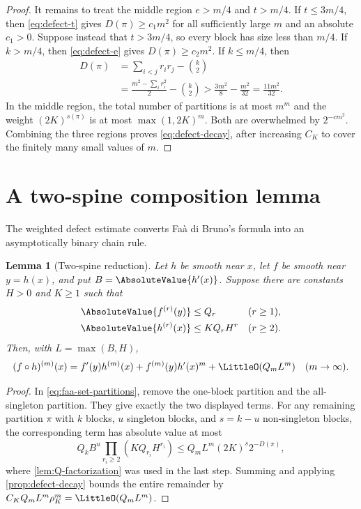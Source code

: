 \documentclass[11pt,oneside]{article}
\newtheorem{lemma}[theorem]{Lemma}
\theoremstyle{definition}
\theoremstyle{remark}
\newcommand{\comp}{\mathbin{\circ}}
\begin{document}
\begin{proof}
It remains to treat the middle region $e>m/4$ and $t>m/4$.  If $t\leq3m/4$, then
\eqref{eq:defect-t} gives $D(\pi)\geq c_1m^2$ for all sufficiently large $m$ and an
absolute $c_1>0$.  Suppose instead that $t>3m/4$, so every block has size less than
$m/4$.  If $k>m/4$, then \eqref{eq:defect-e} gives
$D(\pi)\geq c_2m^2$.  If $k\leq m/4$, then
\begin{align*}
 D(\pi)
 &=\sum_{i<j}r_ir_j-\binom k2\\
 &=\frac{m^2-\sum_i r_i^2}{2}-\binom k2
 >\frac{3m^2}{8}-\frac{m^2}{32}
 =\frac{11m^2}{32}.
\end{align*}
In the middle region, the total number of partitions is at most $m^m$ and the weight
$(2K)^{s(\pi)}$ is at most $\max(1,2K)^m$.  Both are overwhelmed by
$2^{-c m^2}$.  Combining the three regions proves \eqref{eq:defect-decay}, after
increasing $C_K$ to cover the finitely many small values of $m$.
\end{proof}

\section{A two-spine composition lemma}
\label{sec:two-spine}

The weighted defect estimate converts Fa\`a di Bruno's formula into an asymptotically
binary chain rule.

\begin{lemma}[Two-spine reduction]
\label{lem:two-spine}
Let $h$ be smooth near $x$, let $f$ be smooth near $y=h(x)$, and put
$B=\AbsoluteValue{h'(x)}$.  Suppose
there are constants $H>0$ and $K\geq1$ such that
\begin{align}
 \AbsoluteValue{f^{(r)}(y)}&\leq Q_r &&(r\geq1),
 \label{eq:f-envelope}\\
 \AbsoluteValue{h^{(r)}(x)}&\leq KQ_rH^r &&(r\geq2).
 \label{eq:h-envelope}
\end{align}
Then, with $L=\max(B,H)$,
\begin{equation}
 (f\comp h)^{(m)}(x)
 =f'(y)h^{(m)}(x)+f^{(m)}(y)h'(x)^m
  +\LittleO(Q_mL^m)
 \quad(m\to\infty).
 \label{eq:two-spine}
\end{equation}
\end{lemma}

\begin{proof}
In \eqref{eq:faa-set-partitions}, remove the one-block partition and the all-singleton
partition.  They give exactly the two displayed terms.  For any remaining partition
$\pi$ with $k$ blocks, $u$ singleton blocks, and $s=k-u$ non-singleton blocks, the
corresponding term has absolute value at most
\[
 Q_k B^u\prod_{r_i\ge2}(KQ_{r_i}H^{r_i})
 \leq Q_mL^m(2K)^s2^{-D(\pi)},
\]
where \cref{lem:Q-factorization} was used in the last step.  Summing and applying
\cref{prop:defect-decay} bounds the entire remainder by
$C_KQ_mL^m\rho_K^m=\LittleO(Q_mL^m)$.
\end{proof}
\end{document}
